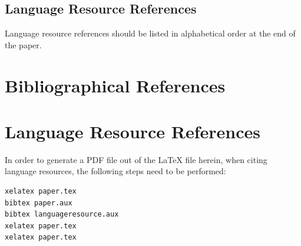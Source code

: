 \documentclass[10pt, a4paper]{article}
\begin{document}
\subsection{Language Resource References}

Language resource references should be listed in alphabetical order at the end of the paper.

\section{Bibliographical References}\label{sec:reference}



\section{Language Resource References}%
\label{lr:ref}
In order to generate a PDF file out of the LaTeX file herein, when citing language resources, the following steps need to be performed:

\begin{lstlisting}[basicstyle=\ttfamily,frame=single]
xelatex paper.tex
bibtex paper.aux
bibtex languageresource.aux
xelatex paper.tex
xelatex paper.tex
\end{lstlisting}
\end{document}
